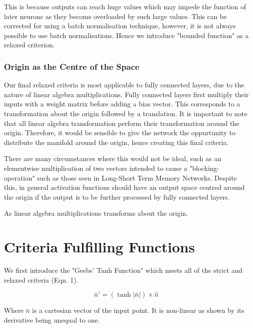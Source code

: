 \documentclass[onecolumn]{article}
\begin{document}
    This is because outputs can reach huge values which may impede the function of later neurons as they become overloaded by such large values. This can be corrected for using a batch normalisation technique, however, it is not always possible to use batch normalisations. Hence we introduce "bounded function" as a relaxed criterion.
       
    \subsubsection{Origin as the Centre of the Space}
        
    Our final relaxed criteria is most applicable to fully connected layers, due to the nature of linear algebra multiplications. Fully connected layers first multiply their inputs with a weight matrix before adding a bias vector. This corresponds to a transformation about the origin followed by a translation. It is important to note that all linear algebra transformation perform their transformation around the origin. Therefore, it would be sensible to give the network the oppurtunity to distribute the manifold around the origin, hence creating this final criteria.
    
    There are many circumstances where this would not be ideal, such as an elementwise multiplication of two vectors intended to cause a "blocking-operation" such as those seen in Long-Short Term Memory Networks. Despite this, in general activation functions should have an output space centred around the origin if the output is to be further processed by fully connected layers.
    
    As linear algebra multiplications transforms about the origin.
       
    \section{Criteria Fulfilling Functions}
       
    We first introduce the "Geebs' Tanh Function" which meets all of the strict and relaxed criteria (Eqn. 1).

    \begin{equation}
        \label{eqn:Geebs' Tanh Function}
        \bar{n}'=\left(\tanh|\bar{n}|\right)\times\hat{n}\
    \end{equation}

    Where $\bar{n}$ is a cartesian vector of the input point. It is non-linear as shown by its derivative being unequal to one.
\end{document}
